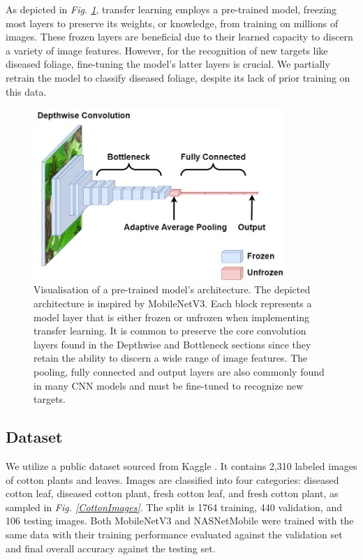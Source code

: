 \documentclass[conference]{IEEEtran}
\begin{document}
As depicted in \emph{Fig. \ref{Transfer Learning}}, transfer learning employs a pre-trained model, freezing most layers to preserve its weights, or knowledge, from training on millions of images. These frozen layers are beneficial due to their learned capacity to discern a variety of image features. However, for the recognition of new targets like diseased foliage, fine-tuning the model's latter layers is crucial. We partially retrain the model to classify diseased foliage, despite its lack of prior training on this data.

\begin{figure}[h]
\centerline{\includegraphics[height=6.5cm, width=1\linewidth]{Images/MobileNetV3_layers.drawio.png}}
\caption{Visualisation of a pre-trained model's architecture. The depicted architecture is inspired by MobileNetV3. Each block represents a model layer that is either frozen or unfrozen when implementing transfer learning. It is common to preserve the core convolution layers found in the Depthwise and Bottleneck sections since they retain the ability to discern a wide range of image features. The pooling, fully connected and output layers are also commonly found in many CNN models and must be fine-tuned to recognize new targets.}
\label{Transfer Learning}
\end{figure}

\subsection{Dataset}
We utilize a public dataset sourced from Kaggle \cite{Kaggle}. It contains 2,310 labeled images of cotton plants and leaves. Images are classified into four categories: diseased cotton leaf, diseased cotton plant, fresh cotton leaf, and fresh cotton plant, as sampled in \emph{Fig. \ref{CottonImages}}. The split is 1764 training, 440 validation, and 106 testing images.  Both MobileNetV3 and NASNetMobile were trained with the same data with their training performance evaluated against the validation set and final overall accuracy against the testing set. 
\end{document}
